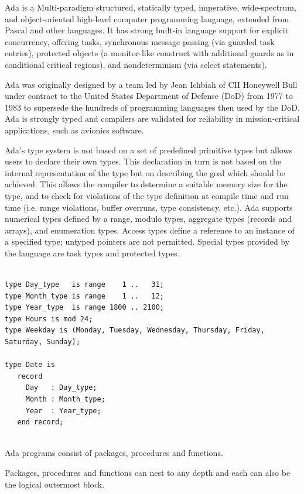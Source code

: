 \documentclass[a4paper,oneside]{report}
\begin{document}
	Ada is a Multi-paradigm structured, statically typed, imperative, wide-spectrum, and object-oriented high-level computer programming language, extended from Pascal and other languages. It has strong built-in language support for explicit concurrency, offering tasks, synchronous message passing (via guarded task entries), protected objects (a monitor-like construct with additional guards as in conditional critical regions), and nondeterminism (via select statements).

	Ada was originally designed by a team led by Jean Ichbiah of CII Honeywell Bull under contract to the United States Department of Defense (DoD) from 1977 to 1983 to supersede the hundreds of programming languages then used by the DoD. Ada is strongly typed and compilers are validated for reliability in mission-critical applications, such as avionics software.


Ada's type system is not based on a set of predefined primitive types but allows users to declare their own types. This declaration in turn is not based on the internal representation of the type but on describing the goal which should be achieved. This allows the compiler to determine a suitable memory size for the type, and to check for violations of the type definition at compile time and run time (i.e. range violations, buffer overruns, type consistency, etc.). Ada supports numerical types defined by a range, modulo types, aggregate types (records and arrays), and enumeration types. Access types define a reference to an instance of a specified type; untyped pointers are not permitted. Special types provided by the language are task types and protected types.


	\begin{lstlisting}[label=Date Type,caption=Ada Date Type] 

type Day_type   is range    1 ..   31;
type Month_type is range    1 ..   12;
type Year_type  is range 1800 .. 2100;
type Hours is mod 24;
type Weekday is (Monday, Tuesday, Wednesday, Thursday, Friday, Saturday, Sunday); 
 
type Date is
   record
     Day   : Day_type;
     Month : Month_type;
     Year  : Year_type;
   end record;


	\end{lstlisting}



	Ada programs consist of packages, procedures and functions.

	Packages, procedures and functions can nest to any depth and each can also be the logical outermost block.
\end{document}
